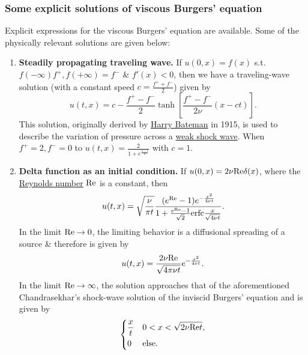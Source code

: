 \documentclass{article}
\begin{document}
\subsubsection{Some explicit solutions of viscous Burgers' equation}
Explicit expressions for the viscous Burgers' equation are available. Some of the physically relevant solutions are given below:
\begin{enumerate}
	\item {\bf Steadily propagating traveling wave.} If $u(0,x) = f(x)$ s.t. $f(-\infty) f^+,f(+\infty) = f^-$ \& $f'(x) < 0$, then we have a traveling-wave solution (with a constant speed $c = \frac{f^+ + f^-}{2}$) given by
	\begin{equation}
		u(t,x) = c - \frac{f^+ - f^-}{2}\tanh\left[\frac{f^+ - f^-}{2\nu}(x - ct)\right].
	\end{equation}
	This solution, originally derived by \href{https://en.wikipedia.org/wiki/Harry_Bateman}{\sc Harry Bateman} in 1915, is used to describe the variation of pressure across a \href{https://en.wikipedia.org/wiki/Becker%E2%80%93Morduchow%E2%80%93Libby_solution#Taylor's_solution:_Weak_shock_waves}{weak shock wave}. When $f^+ = 2,f^- = 0$ to $u(t,x) = \frac{2}{1 + e^{\frac{x - t}{\nu}}}$ with $c = 1$.
	\item {\bf Delta function as an initial condition.} If $u(0,x) = 2\nu{\rm Re}\delta(x)$, where the \href{https://en.wikipedia.org/wiki/Reynolds_number}{Reynolds number} ${\rm Re}$ is a constant, then
	\begin{equation}
		u(t,x) = \sqrt{\frac{\nu}{\pi t}}\frac{(e^{\rm Re} - 1)e^{-\frac{x^2}{4\nu t}}}{1 + \frac{e^{\rm Re} - 1}{\sqrt{2}}{\rm erfc}\frac{x}{\sqrt{4\nu t}}}.
	\end{equation}
	In the limit ${\rm Re}\to0$, the limiting behavior is a diffusional spreading of a source \& therefore is given by
	\begin{equation}
		u(t,x) = \frac{2\nu{\rm Re}}{\sqrt{4\pi\nu t}}e^{-\frac{x^2}{4\nu t}}.
	\end{equation}
	In the limit ${\rm Re}\to\infty$, the solution approaches that of the aforementioned Chandrasekhar's shock-wave solution of the inviscid Burgers' equation and is given by
	\begin{equation*}
		\left\{\begin{split}
			&\frac{x}{t}&&0< x < \sqrt{2\nu{\rm Re}t},\\
			&0&&\mbox{else}.
		\end{split}\right.
	\end{equation*}

\end{enumerate}
\end{document}
